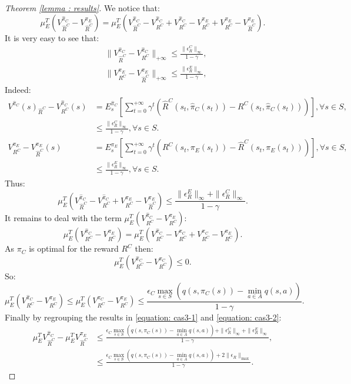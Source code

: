 \documentclass{article} %
\newcommand{\0}{\mathbf{0}}
\newcommand{\1}{\mathbf{1}}
\begin{document}
\begin{proof}[Theorem \ref{lemma : results}]
We notice that:
\begin{equation}
\mu_E^T(V^{\hat{\pi}_C}_{\hat{R}^C}-V^{\pi_E}_{\hat{R}^C})=\mu_E^T(V^{\hat{\pi}_C}_{\hat{R}^C}-V^{\hat{\pi}_C}_{R^C}+V^{\hat{\pi}_C}_{R^C}-V^{\pi_E}_{R^C}+V^{\pi_E}_{R^C}-V^{\pi_E}_{\hat{R}^C}).
\end{equation}
It is very easy to see that:
\begin{align}
&\|V^{\hat{\pi}_C}_{\hat{R}^C}-V^{\hat{\pi}_C}_{R^C}\|_{+\infty}\leq\frac{\|\epsilon^C_R\|_{\infty}}{1-\gamma},
\\
&\|V^{\pi_E}_{R^C}-V^{\pi_E}_{\hat{R}^C}\|_{+\infty}\leq\frac{\|\epsilon^E_R\|_{\infty}}{1-\gamma},
\end{align}
Indeed:
\begin{align}
V^{\hat{\pi}_C}(s)_{\hat{R}^C}-V^{\hat{\pi}_C}_{R^C}(s)&=E^{\hat{\pi}_C}_s[\sum_{t=0}^{+\infty}\gamma^t(\hat{R}^C(s_t,\hat{\pi}_C(s_t))-R^C(s_t,\hat{\pi}_C(s_t)))], \forall s\in S,
\\
&\leq\frac{\|\epsilon^C_R\|_{\infty}}{1-\gamma}, \forall s\in S.
\\
V^{\pi_E}_{R^C}-V^{\pi_E}_{\hat{R}^C}(s)&=E^{\pi_E}_s[\sum_{t=0}^{+\infty}\gamma^t(R^C(s_t,\pi_E(s_t))-\hat{R}^C(s_t,\pi_E(s_t)))], \forall s\in S,
\\
&\leq\frac{\|\epsilon^E_R\|_{\infty}}{1-\gamma}, \forall s\in S.
\end{align}
Thus:
\begin{equation}
\label{equation: cas3-1}
\mu_E^T(V^{\hat{\pi}_C}_{\hat{R}^C}-V^{\hat{\pi}_C}_{R^C}+V^{\pi_E}_{R^C}-V^{\pi_E}_{\hat{R}^C})\leq\frac{\|\epsilon^E_R\|_{\infty}+\|\epsilon^C_R\|_{\infty}}{1-\gamma}.
\end{equation}
It remains to deal with the term $\mu_E^T(V^{\hat{\pi}_C}_{R^C}-V^{\pi_E}_{R^C})$:
\begin{equation}
\mu_E^T(V^{\hat{\pi}_C}_{R^C}-V^{\pi_E}_{R^C})=\mu_E^T(V^{\hat{\pi}_C}_{R^C}-V^{\pi_C}_{R^C}+V^{\pi_C}_{R^C}-V^{\pi_E}_{R^C}).
\end{equation}
As $\pi_C$ is optimal for the reward $R^C$ then:
\begin{equation}
\mu_E^T(V^{\hat{\pi}_C}_{R^C}-V^{\pi_C}_{R^C})\leq 0.
\end{equation}
So:
\begin{equation}
\label{equation: cas3-2}
\mu_E^T(V^{\hat{\pi}_C}_{R^C}-V^{\pi_E}_{R^C})\leq \mu_E^T(V^{\pi_C}_{R^C}-V^{\pi_E}_{R^C})\leq \frac{\epsilon_C\max_{s\in S}(q(s,\pi_C(s))-\min_{a\in A}q(s,a))}{1-\gamma}.
\end{equation}
Finally by regrouping the results in \eqref{equation: cas3-1} and \eqref{equation: cas3-2}:
\begin{align}
\mu_E^TV^{\hat{\pi}_C}_{\hat{R}^C}-\mu_E^TV^{\pi_E}_{\hat{R}^C}&\leq \frac{\epsilon_C\max_{s\in S}(q(s,\pi_C(s))-\min_{a\in A}q(s,a))+\|\epsilon^C_R\|_{\infty}+\|\epsilon^E_R\|_{\infty}}{1-\gamma},
\\
&\leq\frac{\epsilon_C\max_{s\in S}(q(s,\pi_C(s))-\min_{a\in A}q(s,a))+2\|\epsilon_R\|_{\text{max}}}{1-\gamma}.
\end{align}

\end{proof}
\end{document}
